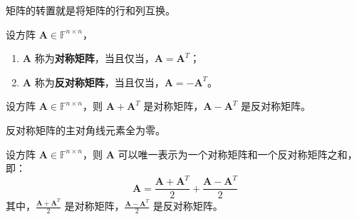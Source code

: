 \begin{note}
    矩阵的转置就是将矩阵的行和列互换。
\end{note}

\vspace{1em}

\begin{definition}
    设方阵 $\mathbf{A} \in \mathbb{F}^{n \times n}$，
    \begin{enumerate}
        \item $\mathbf{A}$ 称为\textbf{对称矩阵}，当且仅当，$\mathbf{A} = \mathbf{A}^T$；
        \item $\mathbf{A}$ 称为\textbf{反对称矩阵}，当且仅当，$\mathbf{A} = -\mathbf{A}^T$。
    \end{enumerate}
    \label{def:symmetric_skew_symmetric_matrix}
\end{definition}

\begin{proposition}
    设方阵 $\mathbf{A} \in \mathbb{F}^{n \times n}$，则 $\mathbf{A} + \mathbf{A}^T$ 是对称矩阵，$\mathbf{A} - \mathbf{A}^T$ 是反对称矩阵。
\end{proposition}

\begin{corollary}
    反对称矩阵的主对角线元素全为零。
\end{corollary}

\begin{corollary}
    设方阵 $\mathbf{A} \in \mathbb{F}^{n \times n}$，则 $\mathbf{A}$ 可以唯一表示为一个对称矩阵和一个反对称矩阵之和，即：
    \[
        \mathbf{A} = \frac{\mathbf{A} + \mathbf{A}^T}{2} + \frac{\mathbf{A} - \mathbf{A}^T}{2}
    \]
    其中，$\frac{\mathbf{A} + \mathbf{A}^T}{2}$ 是对称矩阵，$\frac{\mathbf{A} - \mathbf{A}^T}{2}$ 是反对称矩阵。
    \label{prop:symmetric_decomposition}
\end{corollary}



